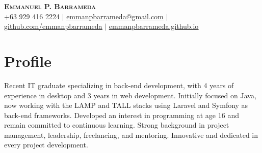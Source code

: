 \documentclass[legal,10pt]{article}
\begin{document}

\begin{center}
    \textbf{\Huge \scshape Emmanuel P. Barrameda} \\ \vspace{1pt}
    \small +63 929 416 2224 $|$ \href{mailto:emmanpbarrameda@gmail.com}{\underline{emmanpbarrameda@gmail.com}} $|$ 
    \href{https://github.com/emmanpbarrameda}{\underline{github.com/emmanpbarrameda}} $|$
    \href{https://emmanpbarrameda.github.io/}{\underline{emmanpbarrameda.github.io}}
\end{center}




\section{Profile}
\begin{justify}
Recent IT graduate specializing in back-end development, with 4 years of experience in desktop and 3 years in web development. Initially focused on Java, now working with the LAMP and TALL stacks using Laravel and Symfony as back-end frameworks. Developed an interest in programming at age 16 and remain committed to continuous learning. Strong background in project management, leadership, freelancing, and mentoring. Innovative and dedicated in every project development.
\end{justify}
\end{document}
